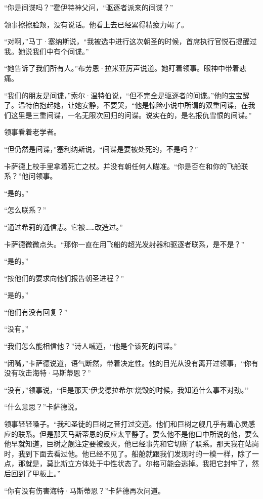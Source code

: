 \documentclass[AutoFakeBold=true]{book}
\begin{document}
\vspace*{1em}

``你是间谍吗？''霍伊特神父问，``驱逐者派来的间谍？''

领事擦擦脸颊，没有说话。他看上去已经累得精疲力竭了。

``对啊，''马丁·塞纳斯说，``我被选中进行这次朝圣的时候，首席执行官悦石提醒过我。她说我们中有个间谍。''

``她告诉了我们所有人。''布劳恩·拉米亚厉声说道。她盯着领事。眼神中带着悲痛。

``我们的朋友是间谍，''索尔·温特伯说，``但不完全是驱逐者的间谍。''他的宝宝醒了。温特伯抱起她，让她安静，不要哭，``他是惊险小说中所谓的双重间谍，在我们这里是三重间谍，一名无限次回归的问谍。说实在的，是名报仇雪恨的间谍。''

领事看着老学者。

``但仍然是间谍，''塞利纳斯说，``间谍是要被处死的，不是吗？''

卡萨德上校手里拿着死亡之杖。并没有朝任何人瞄准。``你是否在和你的飞船联系？''他问领事。

``是的。''

``怎么联系？''

``通过希莉的通信志。它被……改造过。''

卡萨德微微点头。``那你一直在用飞船的超光发射器和驱逐者联系，是不是？''

``是的。''

``按他们的要求向他们报告朝圣进程？''

``是的。''

``他们有没有回复？''

``没有。''

``我们怎么能相信他？''诗人喊道，``他是个该死的间谍。''

``闭嘴，''卡萨德说道，语气断然，带着决定性。他的目光从没有离开过领事，``你有没有攻击海特·马斯蒂恩？''

``没有，''领事说，``但是那天`伊戈德拉希尔'烧毁的时候，我知道什么事不对劲。''

``什么意思？''卡萨德说。

领事轻轻嗓子。``我和圣徒的巨树之音打过交道。他们和巨树之舰几乎有着心灵感应的联系。但是那天马斯蒂恩的反应太平静了。要么他不是他口中所说的他，要么他早就知道，巨树之舰注定要被毁灭，他已经事先和它切断了联系。那天我在站岗时，我到下面去看过他。他已经不见了。船舱就跟我们发现时的一模一样，除了一点，那就是，莫比斯立方体处于中性状态了。尔格可能会逃掉。我把它封牢了，然后回到了甲板上。''

``你有没有伤害海特·马斯蒂恩？''卡萨德再次问道。
\end{document}

